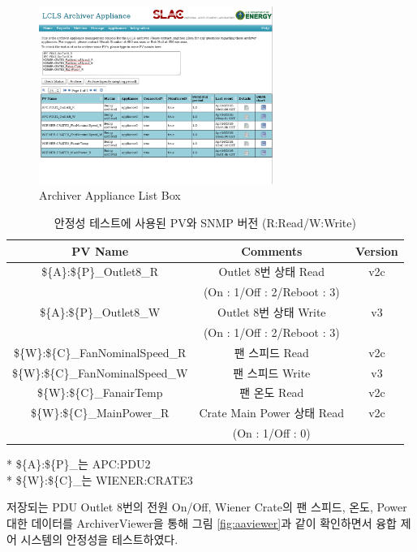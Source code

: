 \documentclass[11pt
  , a4paper
  , article
  , oneside
]{memoir}
\begin{document}
\begin{figure}[h!]
  \centering
  \includegraphics[width=0.68\textwidth]{./images/aaa.eps}
  \caption{Archiver Appliance List Box}
  \label{fig:archiver}   
\end{figure}



\begin{table}[h!]
\begin{center}
\small 
\begin{tabulary}{\textwidth}{C|C|C}
PV Name& Comments & Version\\ \hline
\$\{A\}:\$\{P\}\_Outlet8\_R & Outlet 8번 상태 Read  & v2c\\ 
& (On : 1/Off : 2/Reboot : 3) & \\ \hline
\$\{A\}:\$\{P\}\_Outlet8\_W & Outlet 8번 상태 Write & v3\\
& (On : 1/Off : 2/Reboot : 3) & \\ \hline
\$\{W\}:\$\{C\}\_FanNominalSpeed\_R & 팬 스피드 Read & v2c\\ \hline
\$\{W\}:\$\{C\}\_FanNominalSpeed\_W & 팬 스피드 Write & v3\\ \hline
\$\{W\}:\$\{C\}\_FanairTemp & 팬 온도 Read & v2c\\ \hline
\$\{W\}:\$\{C\}\_MainPower\_R & Crate Main Power 상태 Read & v2c \\ 
& (On : 1/Off : 0)& \\
\end{tabulary}
\caption{안정성 테스트에 사용된 PV와 SNMP 버전 (R:Read/W:Write)  }{* \$\{A\}:\$\{P\}\_는 APC:PDU2} \\{* \$\{W\}:\$\{C\}\_는 WIENER:CRATE3}
  \label{table:pvlist} 
\end{center}
\end{table} 

저장되는 PDU Outlet 8번의 전원 On/Off, Wiener Crate의 팬 스피드, 온도, Power 대한 데이터를 ArchiverViewer을 통해 그림 \ref{fig:aaviewer}과 같이 확인하면서 융합 제어 시스템의 안정성을 테스트하였다. 
 
\end{document}
